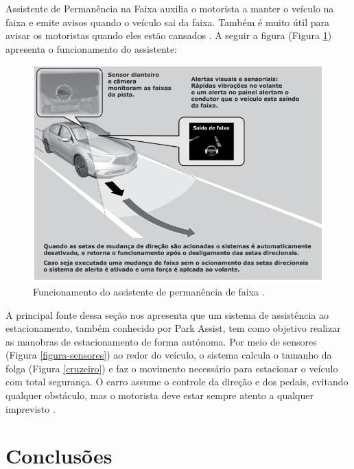 
Assistente de Permanência na Faixa auxilia o motorista a manter o veículo na faixa e emite avisos quando o veículo sai da faixa. Também é muito útil para avisar os motoristas quando eles estão cansados \cite{caio}. A seguir a figura (Figura \ref{assistente}) apresenta o funcionamento do assistente:

\begin{figure}[H]
\centering
\includegraphics[width=\textwidth]{Figures/assistente.png}
\caption{Funcionamento do assistente de permanência de faixa \cite{caio}.}
\label{assistente}
\end{figure}



A principal fonte dessa seção nos apresenta que um sistema de assistência ao estacionamento, também conhecido por Park Assist, tem como objetivo realizar as manobras de estacionamento de forma autónoma. Por meio de sensores (Figura \ref{figura-sensores}) ao redor do veículo, o sistema calcula o tamanho da folga (Figura \ref{cruzeiro}) e faz o movimento necessário para estacionar o veículo com total segurança. O carro assume o controle da direção e dos pedais, evitando qualquer obstáculo, mas o motorista deve estar sempre atento a qualquer imprevisto \cite{caio}.


\chapter{Conclusões} \label{concl}


